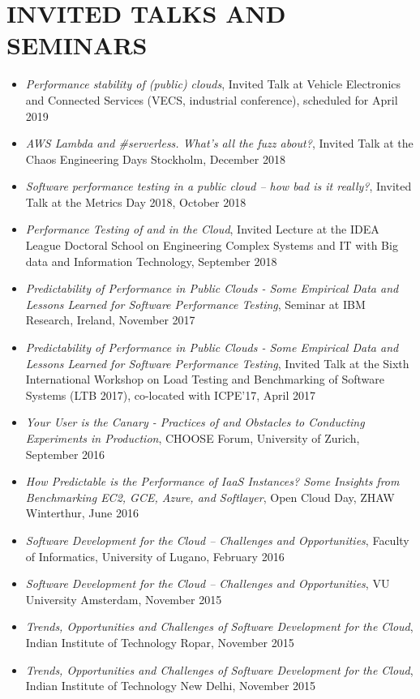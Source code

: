 \documentclass[paper=letter,fontsize=11pt]{scrartcl} %
\newcommand{\NewPart}[2]{\section*{\uppercase{#1} #2}}
\begin{document}
\NewPart{Invited Talks and Seminars}{}

\begin{itemize}
	\item \emph{Performance stability of (public) clouds}, Invited Talk at Vehicle Electronics and Connected Services (VECS, industrial conference), scheduled for April 2019
	\item \emph{AWS Lambda and #serverless. What’s all the fuzz about?}, Invited Talk at the Chaos Engineering Days Stockholm, December 2018
		\item \emph{Software performance testing in a public cloud – how bad is it really?}, Invited Talk at the Metrics Day 2018, October 2018
		\item \emph{Performance Testing of and in the Cloud}, Invited Lecture at the IDEA League Doctoral School on Engineering Complex Systems and IT with Big data and Information Technology, September 2018
\item \emph{Predictability of Performance in Public Clouds - Some Empirical Data and Lessons Learned for Software Performance Testing}, Seminar at IBM Research, Ireland, November 2017
\item \emph{Predictability of Performance in Public Clouds - Some Empirical Data and Lessons Learned for Software Performance Testing}, Invited Talk at the Sixth International Workshop on Load Testing and Benchmarking of Software Systems (LTB 2017), co-located with ICPE'17, April 2017
\item \emph{Your User is the Canary - Practices of and Obstacles to Conducting Experiments in Production}, CHOOSE Forum, University of Zurich, September 2016
\item \emph{How Predictable is the Performance of IaaS Instances? Some Insights from Benchmarking EC2, GCE, Azure, and Softlayer}, Open Cloud Day, ZHAW Winterthur, June 2016
\item \emph{Software Development for the Cloud – Challenges and Opportunities}, Faculty of Informatics, University of Lugano, February 2016
\item \emph{Software Development for the Cloud – Challenges and Opportunities}, VU University Amsterdam, November 2015
\item \emph{Trends, Opportunities and Challenges of Software Development for the Cloud}, Indian Institute of Technology Ropar, November 2015
\item \emph{Trends, Opportunities and Challenges of Software Development for the Cloud}, Indian Institute of Technology New Delhi, November 2015

\end{itemize}
\end{document}
